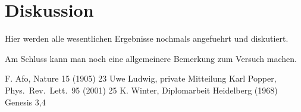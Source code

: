 \documentclass[12pt, a4paper]{scrartcl}
\begin{document}
	
	
	\section{Diskussion}
	
	Hier werden alle wesentlichen Ergebnisse nochmals angefuehrt und diskutiert. 
	
	Am Schluss kann man noch eine allgemeinere Bemerkung zum Versuch machen.
	
	
	\newpage 
	
	\begin{thebibliography}{00}   %
		
		 F. Afo, Nature 15 (1905) 23
		 Uwe Ludwig, private Mitteilung
		 Karl Popper, Phys.~Rev.~Lett.~95 (2001) 25
		 K. Winter, Diplomarbeit Heidelberg (1968)
		 Genesis 3,4
		
	\end{thebibliography}
	
\end{document}
